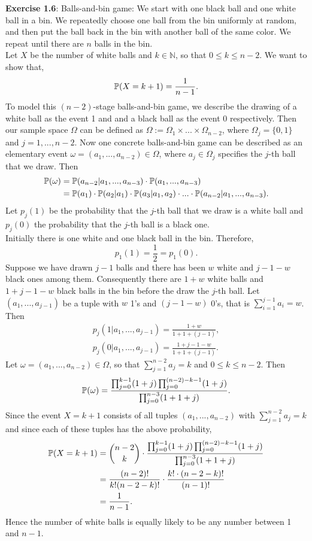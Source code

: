 \textbf{Exercise 1.6}: Balls-and-bin game: We start with one black ball and one
white ball in a bin. We repeatedly choose one ball from the bin uniformly at
random, and then put the ball back in the bin with another ball of the same color.
We repeat until there are $n$ balls in the bin. \\[0,2cm]
Let $X$ be the number of white balls and $k \in \mathbb{N}$, so that $0 \leq k
\leq n-2$. We want to show that,
\[ \mathbb{P}(X=k+1) = \frac{1}{n-1}. \]
To model this $(n-2)$-stage balls-and-bin game, we describe the drawing of a white
ball as the event 1 and and a black ball as the event 0 respectively. Then our
sample space $\Omega$ can be defined as $\Omega := \Omega_1 \times ... \times
\Omega_{n-2}$, where $\Omega_j = \{ 0, 1\}$ and $j = 1,...,n-2$. Now one concrete
balls-and-bin game can be described as an elementary event $\omega =
(a_1,...,a_{n-2}) \in \Omega$, where $a_j \in \Omega_j$ specifies the $j$-th ball
that we draw. Then
\begin{align*}
  \mathbb{P}(\omega)
    &= \mathbb{P}(a_{n-2}| a_1,...,a_{n-3}) \cdot \mathbb{P}(a_1,...,a_{n-3}) \\
    &= \mathbb{P}(a_1) \cdot \mathbb{P}(a_2| a_1) \cdot \mathbb{P}(a_3| a_1,a_2) \cdot ... \cdot \mathbb{P}(a_{n-2}| a_1,...,a_{n-3}).
\end{align*}
Let $p_j(1)$ be the probability that the $j$-th ball that we draw is
a white ball and $p_j(0)$ the probability that the $j$-th ball is a black one. \\
Initially there is one white and one black ball in the bin. Therefore,
\[ p_1(1) = \frac{1}{2} = p_1(0). \]
Suppose we have drawn $j-1$ balls and there has been $w$ white and $j-1-w$ black
ones among them. Consequently there are $1 + w$ white balls and $1 + j - 1 - w$
black balls in the bin before the draw the $j$-th ball. Let
$\left(a_1,...,a_{j-1}\right)$ be a tuple with $w$ 1's and $(j-1-w)$ 0's, that is
$\sum_{i=1}^{j-1}a_i = w$. Then
\begin{align*}
    p_j(1|a_1,...,a_{j-1}) = \frac{1 + w}{1 + 1 + (j-1)}, \\
    p_j(0|a_1,...,a_{j-1}) = \frac{1+j-1-w}{1 + 1 + (j-1)}.
\end{align*}
Let $\omega = (a_1, ..., a_{n-2}) \in \Omega$, so that $\sum_{j=1}^{n-2}a_j = k$
and $0 \leq k \leq n-2$. Then
\[
  \mathbb{P}(\omega) = \frac {\prod_{j=0}^{k-1}(1 + j) \prod_{j=0}^{(n-2)-k-1}(1 + j)}
                      {\prod_{j=0}^{n-3}(1+1+j)}.
\]
Since the event $X=k+1$ consists of all tuples $(a_1,...,a_{n-2})$ with
$\sum_{j=1}^{n-2}a_j = k$ and since each of these tuples has the above probability,
\begin{align*}
  \mathbb{P}(X=k+1)
    &= \binom{n-2}{k} \cdot \frac {\prod_{j=0}^{k-1}(1 + j) \prod_{j=0}^{(n-2)-k-1}(1 + j)}{\prod_{j=0}^{n-3}(1+1+j)} \\
    &= \frac{(n-2)!}{k! (n-2-k)!} \cdot \frac{k! \cdot (n-2-k)!}{(n-1)!} \\
    &= \frac{1}{n-1}.
\end{align*}
Hence the number of white balls is equally likely to be any number between 1 and
$n-1$. \\[0.5cm]
